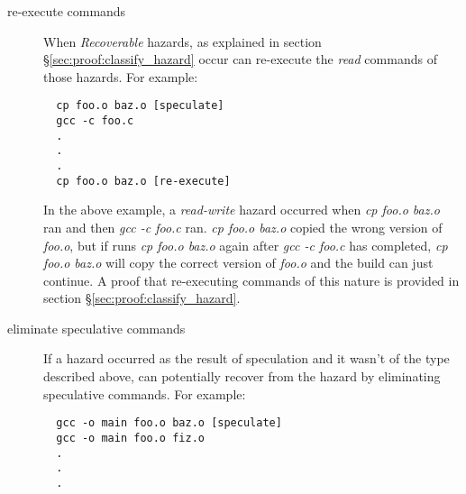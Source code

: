 \begin{description}
\item [re-execute commands]
  When \emph{Recoverable} hazards, as explained in section \S\ref{sec:proof:classify_hazard} occur \Rattle can re-execute the \emph{read} commands of those hazards.  For example:
\begin{verbatim}
  cp foo.o baz.o [speculate]
  gcc -c foo.c
  .
  .
  .
  cp foo.o baz.o [re-execute]
\end{verbatim}

In the above example, a \emph{read-write} hazard occurred when \emph{cp foo.o baz.o} ran and then \emph{gcc -c foo.c} ran.  \emph{cp foo.o baz.o} copied the wrong version of \emph{foo.o}, but if \Rattle
runs \emph{cp foo.o baz.o} again after \emph{gcc -c foo.c} has completed, \emph{cp foo.o baz.o} will copy the correct version of \emph{foo.o} and the build can just continue.  A proof that \Rattle
re-executing commands of this nature is provided in section \S\ref{sec:proof:classify_hazard}.

\item [eliminate speculative commands]
  If a hazard occurred as the result of speculation and it wasn't of the type described above, \Rattle can potentially recover from the hazard by eliminating speculative commands.  For example:
\begin{verbatim}
  gcc -o main foo.o baz.o [speculate]
  gcc -o main foo.o fiz.o
  .
  .
  .
\end{verbatim}

  
\end{description}

